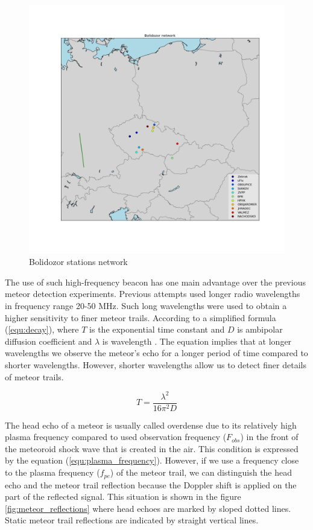 \documentclass[twoside]{ctuthesis}
\theoremstyle{plain}
\theoremstyle{definition}
\theoremstyle{note}
\begin{document}
\begin{figure}
 \begin{center}
 \includegraphics[width=\linewidth]{./img/stanice_mapa.png}
 \caption{Bolidozor stations network}
  \label{fig:stanice_mapa} 
 \end{center}
\end{figure}
                   
The use of such high-frequency beacon has one main advantage over the previous meteor detection experiments.
Previous attempts used longer radio wavelengths in frequency range 20-50 MHz. Such long wavelengths were used to obtain a higher sensitivity to finer meteor trails. According to a simplified formula (\ref{equ:decay}), where $T$ is the exponential time constant and $D$ is ambipolar diffusion coefficient and $\lambda$ is wavelength \cite{Decay_time}. The equation implies that at longer wavelengths we observe the meteor's echo for a longer period of time compared to shorter wavelengths. However, shorter wavelengths allow us to detect finer details of meteor trails.

\begin{equation}
T = \frac{\lambda^2}{16 \pi ^2 D}
\label{equ:decay}
\end{equation}

The head echo of a meteor is usually called overdense due to its relatively high plasma frequency compared to used observation frequency ($F_{obs}$) in the front of the meteoroid shock wave that is created in the air. This condition is expressed by the equation (\ref{equ:plasma_frequency}). However, if we use a frequency close to the plasma frequency ($f_{pe}$) of the meteor trail, we can distinguish the head echo and the meteor trail reflection because the Doppler shift is applied on the part of the reflected signal. This situation is shown in the figure \ref{fig:meteor_reflections} where head echoes are marked by sloped dotted lines. Static meteor trail reflections are indicated by straight vertical lines.
\end{document}
